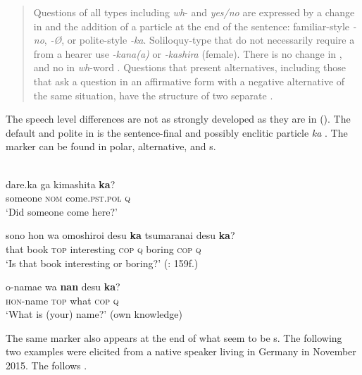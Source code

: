 \begin{quote}
Questions of all types including \textit{wh}- and \textit{yes/no}  are expressed by a change in  and the addition of a particle at the end of the sentence: familiar-style \textit{-no}, \textit{-Ø}, or polite-style \textit{-ka}. Soliloquy-type  that do not necessarily require a  from a hearer use \textit{-kana(a)} or \textit{-kashira} (female). There is no change in , and no  in \textit{wh}-word . Questions that present alternatives, including those that ask a question in an affirmative form with a negative alternative of the same situation, have the structure of two separate .
\end{quote}

\noindent The speech level differences are not as strongly developed as they are in   (). The default and polite  in  is the sentence-final and possibly enclitic particle \textit{ka} .
The marker can be found in polar, alternative, and s.

\ea%
    \label{ex:japa:2}
    \\
    \ea
    \gll dare.ka    ga  kimashita \textbf{{ka}}?\\
    someone  \textsc{nom}  come.\textsc{pst.pol}  \textsc{q}\\
    \glt ‘Did someone come here?’ \citep[104]{Hasegawa2015}
    
    \ex
    \gll sono  hon wa omoshiroi  desu \textbf{{ka}} tsumaranai  desu \textbf{{ka}}?\\
    that  book  \textsc{top}  interesting  \textsc{cop}  \textsc{q}  boring    \textsc{cop} \textsc{q}\\
    \glt ‘Is that book interesting or boring?’ (\citealt{Hinds1984}: 159f.)
    
    \ex
    \gll o-namae  wa \textbf{{nan}} desu \textbf{{ka}}?\\
    \textsc{hon}-name  \textsc{top}  what  \textsc{cop}  \textsc{q}\\
    \glt ‘What is (your) name?’ (own knowledge)
    \z
    \z 

\noindent The same marker also appears at the end of what seem to be s. The following two examples were elicited from a native speaker living in Germany in November 2015. The  follows \citet{Hasegawa2015}.

